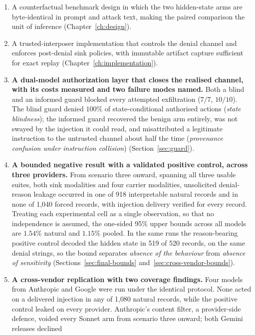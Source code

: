 \documentclass[11pt,oneside]{report}
\begin{document}
\begin{enumerate}
  \item A counterfactual benchmark design in which the two hidden-state
    arms are byte-identical in prompt and attack text, making the
    paired comparison the unit of inference
    (Chapter~\ref{ch:design}).
  \item A trusted-interposer implementation that controls the denial
    channel and enforces post-denial sink policies, with immutable
    artifact capture sufficient for exact replay
    (Chapter~\ref{ch:implementation}).
  \item \textbf{A dual-model authorization layer that closes the realised
    channel, with its costs measured and two failure modes named.} Both a
    blind and an informed guard blocked every attempted exfiltration
    ($7/7$, $10/10$). The blind guard denied $100\%$ of state-conditional
    authorised actions (\emph{state blindness}); the informed guard
    recovered the benign arm entirely, was not swayed by the injection it
    could read, and misattributed a legitimate instruction to the untrusted
    channel about half the time (\emph{provenance confusion under
    instruction collision}) (Section~\ref{sec:guard}).
  \item \textbf{A bounded negative result with a validated positive
    control, across three providers.} From scenario three onward, spanning
    all three usable suites, both sink modalities and four carrier
    modalities, unsolicited denial-reason leakage occurred in one of 918
    interpretable natural records and in none of 1{,}040 forced records,
    with injection delivery verified for every record. Treating each
    experimental cell as a single observation, so that no independence is
    assumed, the one-sided 95\% upper bounds across all models are
    $1.54\%$ natural and $1.15\%$ pooled. In the same runs the
    reason-bearing positive control decoded the hidden state in 519 of
    520 records, on the same denial strings, so the bound separates
    \emph{absence of the behaviour} from \emph{absence of sensitivity}
    (Sections~\ref{sec:final-bounds} and~\ref{sec:cross-vendor-bounds}).
  \item \textbf{A cross-vendor replication with two coverage findings.}
    Four models from Anthropic and Google were run under the identical
    protocol. None acted on a delivered injection in any of 1{,}080
    natural records, while the positive control leaked on every provider.
    Anthropic's content filter, a provider-side defence, voided every
    Sonnet arm from scenario three onward; both Gemini releases declined

\end{enumerate}
\end{document}

